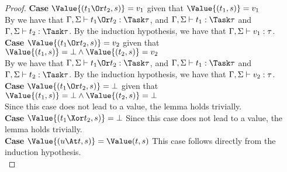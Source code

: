 \begin{proof}
  \noindent\textbf{Case} $\Value{(t_1\Or t_2,s)}=v_1$ given that
  $\Value{(t_1,s)}=v_1$\\
  By  we have that $\Gamma,\Sigma\infers t_1\Or t_2:\Task\tau$,
  and $\Gamma,\Sigma\infers t_1:\Task\tau$ and
  $\Gamma,\Sigma\infers t_2:\Task\tau$. By the induction hypothesis, we have
  that $\Gamma,\Sigma\vdash v_1:\tau$.\\

  \noindent\textbf{Case} $\Value{(t_1\Or t_2,s)}=v_2$ given that
  $\Value{(t_1,s)}=\bot\wedge\Value{(t_2,s)}=v_2$\\
  By  we have that $\Gamma,\Sigma\infers t_1\Or t_2:\Task\tau$,
  and $\Gamma,\Sigma\infers t_1:\Task\tau$ and
  $\Gamma,\Sigma\infers t_2:\Task\tau$. By the induction hypothesis, we have
  that $\Gamma,\Sigma\vdash v_2:\tau$.\\

  \noindent\textbf{Case} $\Value{(t_1\Or t_2,s)}=\bot$ given that
  $\Value{(t_1,s)}=\bot\wedge\Value{(t_2,s)}=\bot$\\ Since this case does not
  lead to a value, the lemma holds trivially.\\

  \noindent\textbf{Case} $\Value{(t_1\Xor t_2,s)}=\bot$ Since this case does not
  lead to a value, the lemma holds trivially.\\

  \noindent\textbf{Case} $\Value{(u\At t,s)}=\Value(t,s)$ This case follows
  directly from the induction hypothesis.\\
\end{proof}



